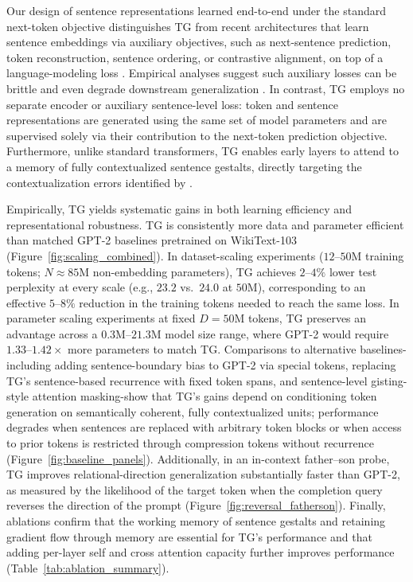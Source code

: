 \documentclass{article}
\begin{document}
Our design of sentence representations learned end-to-end under the standard next-token objective distinguishes TG from recent architectures that learn sentence embeddings via auxiliary objectives, such as next-sentence prediction, token reconstruction, sentence ordering, or contrastive alignment, on top of a language-modeling loss \citep{devlin2019bert,duquenne2023sonar,lan2019albert,gao2021simcse,kashyap2024sentencesurvey}. Empirical analyses suggest such auxiliary losses can be brittle and even degrade downstream generalization \citep{liu2019roberta,Aroca-Ouellette2020OnLosses}. In contrast, TG employs no separate encoder or auxiliary sentence-level loss: token and sentence representations are generated using the same set of model parameters and are supervised solely via their contribution to the next-token prediction objective. 
Furthermore, unlike standard transformers, TG enables early layers to attend to a memory of fully contextualized sentence gestalts, directly targeting the contextualization errors identified by \citet{lepori2024racingthoughts}. 


Empirically, TG yields systematic gains in both learning efficiency and representational robustness. 
TG is consistently more data and parameter efficient than matched GPT-2 baselines pretrained on WikiText-103 (Figure~\ref{fig:scaling_combined}). 
In dataset-scaling experiments ($12$--$50$M training tokens; $N \approx 85$M non-embedding parameters), TG achieves $2$--$4\%$ lower test perplexity at every scale (e.g., $23.2$ vs.\ $24.0$ at $50$M), corresponding to an effective $5$--$8\%$ reduction in the training tokens needed to reach the same loss. 
In parameter scaling experiments at fixed $D=50$M tokens, TG preserves an advantage across a $0.3$M--$21.3$M model size range, where GPT-2 would require $1.33$--$1.42\times$ more parameters to match TG. 
Comparisons to alternative baselines-including adding sentence-boundary bias to GPT-2 via special tokens, replacing TG's sentence-based recurrence with fixed token spans, and sentence-level gisting-style attention masking-show that TG's gains depend on conditioning token generation on semantically coherent, fully contextualized units; performance degrades when sentences are replaced with arbitrary token blocks or when  access to prior tokens is restricted through compression tokens without recurrence (Figure~\ref{fig:baseline_panels}).
Additionally, in an in-context father--son probe, TG improves relational-direction generalization substantially faster than GPT-2, as measured by the likelihood of the target token when the completion query reverses the direction of the prompt (Figure~\ref{fig:reversal_fatherson}).
Finally, ablations confirm that the working memory of sentence gestalts and retaining gradient flow through memory are essential for TG’s performance and that adding per-layer self and cross attention capacity further improves performance (Table~\ref{tab:ablation_summary}).
\end{document}
